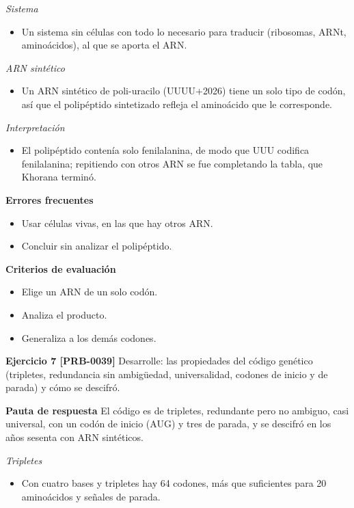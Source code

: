 \documentclass{book}
\begin{document}
\noindent\textit{Sistema}
\begin{itemize}
\item Un sistema sin células con todo lo necesario para traducir (ribosomas, ARNt, aminoácidos), al que se aporta el ARN.
\end{itemize}

\noindent\textit{ARN sintético}
\begin{itemize}
\item Un ARN sintético de poli-uracilo (UUU{U+2026}) tiene un solo tipo de codón, así que el polipéptido sintetizado refleja el aminoácido que le corresponde.
\end{itemize}

\noindent\textit{Interpretación}
\begin{itemize}
\item El polipéptido contenía solo fenilalanina, de modo que UUU codifica fenilalanina; repitiendo con otros ARN se fue completando la tabla, que Khorana terminó.
\end{itemize}

\noindent\textbf{Errores frecuentes}
\begin{itemize}
\item Usar células vivas, en las que hay otros ARN.
\item Concluir sin analizar el polipéptido.
\end{itemize}

\noindent\textbf{Criterios de evaluación}
\begin{itemize}
\item Elige un ARN de un solo codón.
\item Analiza el producto.
\item Generaliza a los demás codones.
\end{itemize}

\noindent\textbf{Ejercicio 7 [PRB-0039]}
Desarrolle: las propiedades del código genético (tripletes, redundancia sin ambigüedad, universalidad, codones de inicio y de parada) y cómo se descifró.


\noindent\textbf{Pauta de respuesta}
El código es de tripletes, redundante pero no ambiguo, casi universal, con un codón de inicio (AUG) y tres de parada, y se descifró en los años sesenta con ARN sintéticos.


\noindent\textit{Tripletes}
\begin{itemize}
\item Con cuatro bases y tripletes hay 64 codones, más que suficientes para 20 aminoácidos y señales de parada.
\end{itemize}
\end{document}
